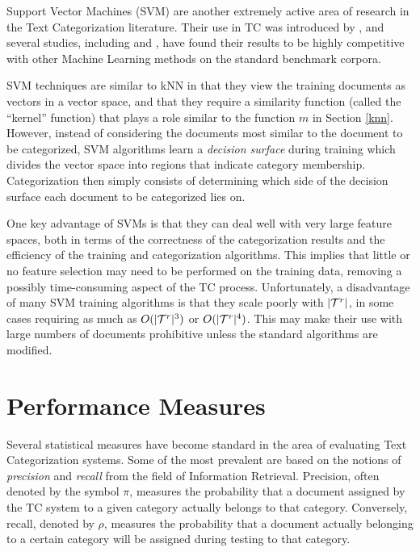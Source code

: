 Support Vector Machines (SVM) are another extremely active area of
research in the Text Categorization literature.  Their use in TC was
introduced by \cite{joachims:98}, and several studies, including
\cite{joachims:98} and \cite{yang:99}, have found their results to be
highly competitive with other Machine Learning methods on the standard
benchmark corpora.

SVM techniques are similar to kNN in that they view the training
documents as vectors in a vector space, and that they require a
similarity function (called the ``kernel'' function) that plays a role
similar to the function $m$ in Section
\ref{knn}. \cite[ch. 1]{scholkopf:02} However, instead of considering
the documents most similar to the document to be categorized, SVM
algorithms learn a \emph{decision surface} during training which
divides the vector space into regions that indicate category
membership.  Categorization then simply consists of determining which
side of the decision surface each document to be categorized lies on.

One key advantage of SVMs is that they can deal well with very large
feature spaces, both in terms of the correctness of the categorization
results and the efficiency of the training and categorization
algorithms.  This implies that little or no feature selection may need
to be performed on the training data, removing a possibly
time-consuming aspect of the TC process.  Unfortunately, a
disadvantage of many SVM training algorithms is that they scale poorly
with $|\mathcal{T}^r|$, in some cases requiring as much as $O(|\mathcal{T}^r|^3)$ or
$O(|\mathcal{T}^r|^4)$.  This may make their use with large numbers of
documents prohibitive unless the standard algorithms are modified.


\section{Performance Measures}
\label{measures}

Several statistical measures have become standard in the area of
evaluating Text Categorization systems. \cite[p. 33]{sebastiani:02}
Some of the most prevalent are based on the notions of
\emph{precision} and \emph{recall} from the field of Information
Retrieval. \cite{rijsbergen:79} Precision, often denoted by the symbol
$\pi$, measures the probability that a document assigned by the TC
system to a given category actually belongs to that category.
Conversely, recall, denoted by $\rho$, measures the probability that a
document actually belonging to a certain category will be assigned
during testing to that category. \cite[p. 33]{sebastiani:02}

